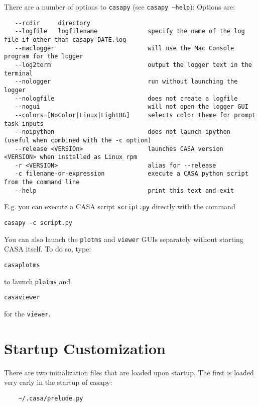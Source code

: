 There are a number of options to {\tt casapy} (see {\tt casapy --help}):
Options are: 
\small
\begin{verbatim}
   --rcdir     directory
   --logfile   logfilename              specify the name of the log file if other than casapy-DATE.log
   --maclogger                          will use the Mac Console program for the logger
   --log2term                           output the logger text in the terminal
   --nologger                           run without launching the logger
   --nologfile                          does not create a logfile 
   --nogui                              will not open the logger GUI 
   --colors=[NoColor|Linux|LightBG]     selects color theme for prompt task inputs
   --noipython                          does not launch ipython (useful when combined with the -c option)
   --release <VERSIOn>                  launches CASA version <VERSION> when installed as Linux rpm
   -r <VERSION>                         alias for --release
   -c filename-or-expression            execute a CASA python script from the command line 
   --help                               print this text and exit
\end{verbatim}
\normalsize

E.g. you can execute a CASA script {\tt script.py} directly with the command
\small
\begin{verbatim}
casapy -c script.py
\end{verbatim}
\normalsize


You can also launch the {\tt plotms} and {\tt viewer} GUIs separately
without starting CASA itself. To do so, type:

\small
\begin{verbatim}
casaplotms
\end{verbatim}
\normalsize
to launch {\tt plotms} and 
\small
\begin{verbatim}
casaviewer
\end{verbatim}
\normalsize
for the {\tt viewer}.




\section{Startup Customization}
\label{section:install.customization}

There are two initialization files that are loaded upon startup. The
first is loaded very early in the startup of casapy:

\small
\begin{verbatim}
	~/.casa/prelude.py
\end{verbatim}
\normalsize

